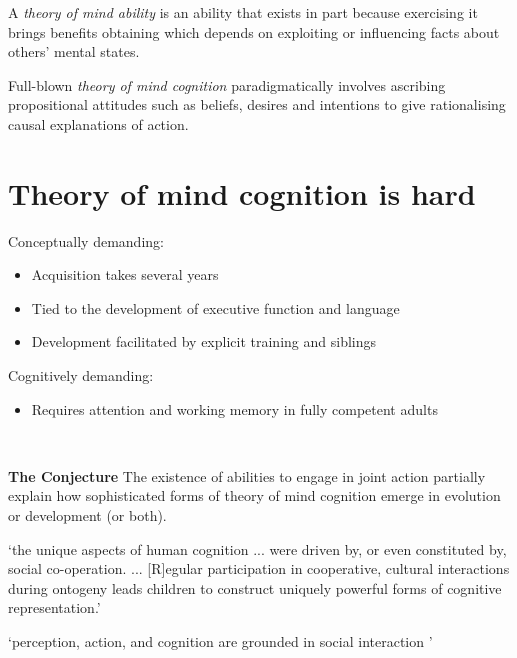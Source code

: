 \documentclass[11pt]{extarticle}
\begin{document}
\begin{multicols}{3}
A \emph{theory of mind ability} is an ability that exists in part because exercising it brings benefits obtaining which depends on exploiting or influencing facts about others’ mental states.  

Full-blown \emph{theory of mind cognition} paradigmatically involves ascribing propositional attitudes such as beliefs, desires and intentions to give rationalising causal explanations of action. 



\section{Theory of mind cognition is hard}

Conceptually demanding:
\begin{itemize}\itemsep0pt
\item Acquisition takes several years\citep{Wimmer:1983dz,Wellman:2001lz}
\item Tied to the development of executive function\citep{Perner:1999yr,Sabbagh:2006ke} and language\citep{Astington2005ot}
\item Development facilitated by explicit training\citep{Slaughter:1996fv} and siblings\citep{Clements:2000nc,Hughes:2004zj}
\end{itemize}
%
Cognitively demanding: 
\begin{itemize}
\item Requires attention and working memory in fully competent adults\citep{Apperly:2008jv,McKinnon:2007rr}
\end{itemize}


\ 

{\Large
\textbf{The Conjecture}
The existence of abilities to engage in joint action partially explain how sophisticated forms of theory of mind cognition emerge in evolution or development (or both).
}

`the unique aspects of human cognition ... were driven by, or even constituted by, social co-operation. ...
[R]egular participation in cooperative, cultural interactions during ontogeny leads children to construct uniquely powerful forms of cognitive representation.'
\citep%
{Moll:2007gu}



`perception, action, and cognition are grounded in social interaction%
'\citep%
{Knoblich:2006bn}



\end{multicols}
\end{document}
